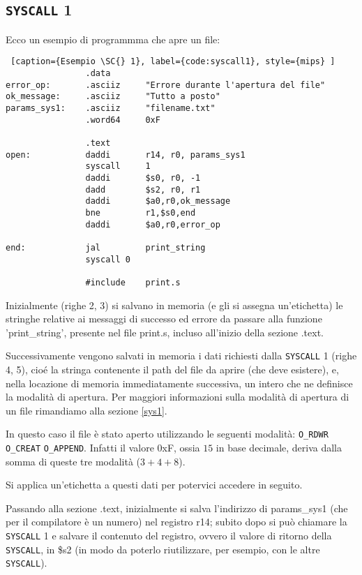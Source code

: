 \documentclass[12pt]{report}
\newcommand{\SC}{\texttt{SYSCALL}}
\begin{document}
\subsection{\SC{} 1}
Ecco un esempio di programmma che apre un file:
\begin{lstlisting} [caption={Esempio \SC{} 1}, label={code:syscall1}, style={mips} ] 
                .data 
error_op:       .asciiz     "Errore durante l'apertura del file"    
ok_message:     .asciiz     "Tutto a posto"
params_sys1:    .asciiz     "filename.txt"
                .word64     0xF                    

                .text
open:           daddi       r14, r0, params_sys1    
                syscall     1    
                daddi       $s0, r0, -1
                dadd        $s2, r0, r1        
                daddi       $a0,r0,ok_message            
                bne         r1,$s0,end            
                daddi       $a0,r0,error_op

end:            jal         print_string
                syscall 0
        
                #include    print.s      
\end{lstlisting}

Inizialmente (righe 2, 3) si salvano in memoria (e gli si assegna
un'etichetta) le stringhe relative ai messaggi di successo ed errore da passare 
alla funzione 'print\_string', presente nel file print.s, incluso all'inizio
della sezione .text.

Successivamente vengono salvati in memoria i dati richiesti dalla \SC{} 1 (righe 4,
5), cio\'e la stringa contenente il path del file da aprire (che deve esistere),
e, nella locazione di memoria immediatamente successiva, un intero che ne
definisce la modalit\`a di apertura. Per maggiori informazioni sulla modalit\`a
di apertura di un file rimandiamo alla sezione \ref{sys1}.

In questo caso il file \`e stato aperto utilizzando le seguenti modalit\`a:
\texttt{O\_RDWR} \textbar{} \texttt{O\_CREAT} \textbar{} \texttt{O\_APPEND}. Infatti il valore
0xF, ossia $15$ in base decimale, deriva dalla somma di queste tre modalit\`a
($3+4+8$).

Si applica un'etichetta a questi dati per potervici accedere in seguito.

Passando alla sezione .text, inizialmente si salva
l'indirizzo di params\_sys1 (che per il compilatore \`{e} un numero) nel registro
r14; subito dopo si pu\`{o} chiamare la \SC{} 1 e salvare il contenuto del
registro, ovvero il valore di ritorno della \SC{}, in \$s2 (in modo da poterlo 
riutilizzare, per esempio, con le altre \SC{}).
\end{document}
